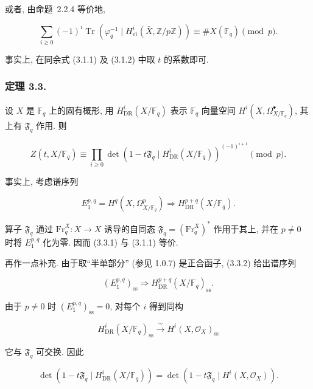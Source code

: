 或者, 由命题~2.2.4 等价地,

\begin{equation}\tag{3.2.2}
\sum_{i\geq0}(-1)^i
\operatorname{Tr}\!\left(\varphi_q^{-1}\mid
H^i_{\mathrm{et}}(\bar X,\mathbb Z/p\mathbb Z)\right)
\equiv \#X(\mathbb F_q)\pmod p.
\end{equation}

事实上, 在同余式 (3.1.1) 及 (3.1.2) 中取 $t$ 的系数即可.

\subsubsection*{定理 3.3.}
设 $X$ 是 $\mathbb F_q$ 上的固有概形, 用 $H^i_{\mathrm{DR}}(X/\mathbb F_q)$
表示 $\mathbb F_q$ 向量空间 $H^i(X,\Omega^\bullet_{X/\mathbb F_q})$,
其上有 $\mathfrak F_q$ 作用. 则

\begin{equation}\tag{3.3.1}
Z(t,X/\mathbb F_q)
\equiv
\prod_{i\geq0}
\det\!\left(1-t\mathfrak F_q\mid
H^i_{\mathrm{DR}}(X/\mathbb F_q)\right)^{(-1)^{i+1}}
\pmod p.
\end{equation}

事实上, 考虑谱序列

\begin{equation}\tag{3.3.2}
E_1^{p,q}=H^q(X,\Omega^p_{X/\mathbb F_q})
\Longrightarrow H^{p+q}_{\mathrm{DR}}(X/\mathbb F_q).
\end{equation}

算子 $\mathfrak F_q$ 通过 $\mathrm{Fr}_q^X:X\longrightarrow X$ 诱导的自同态
$\mathfrak F_q=(\mathrm{Fr}_q^X)^*$ 作用于其上,
并在 $p\ne0$ 时将 $E_1^{p,q}$ 化为零. 因而 (3.3.1) 与 (3.1.1) 等价.

再作一点补充. 由于取“半单部分” (参见 1.0.7) 是正合函子,
(3.3.2) 给出谱序列

\begin{equation}\tag{3.3.3}
(E_1^{p,q})_{\mathrm{ss}}
\Longrightarrow H^{p+q}_{\mathrm{DR}}(X/\mathbb F_q)_{\mathrm{ss}}.
\end{equation}

由于 $p\ne0$ 时 $(E_1^{p,q})_{\mathrm{ss}}=0$, 对每个 $i$ 得到同构

\begin{equation}\tag{3.3.4}
H^i_{\mathrm{DR}}(X/\mathbb F_q)_{\mathrm{ss}}
\xrightarrow{\ \sim\ }
H^i(X,\mathcal O_X)_{\mathrm{ss}}
\end{equation}

它与 $\mathfrak F_q$ 可交换. 因此

\begin{equation}\tag{3.3.5}
\det\!\left(1-t\mathfrak F_q\mid H^i_{\mathrm{DR}}(X/\mathbb F_q)\right)
=
\det\!\left(1-t\mathfrak F_q\mid H^i(X,\mathcal O_X)\right).
\end{equation}
